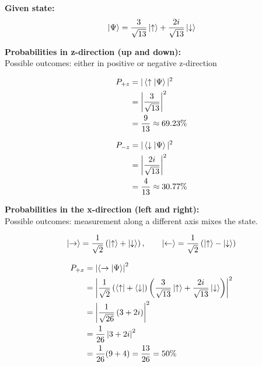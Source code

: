 \documentclass[12pt]{article}
\begin{document}
\textbf{Given state:}
\[
\ket{\Psi}=\frac{3}{\sqrt{13}}\ket{\uparrow} + \frac{2i}{\sqrt{13}}\ket{\downarrow}
\]

\textbf{Probabilities in z-direction (up and down):} \\
Possible outcomes: either in positive or negative z-direction

\begin{equation}
    \begin{split}
        P_{+z} &= |\braket{ \uparrow | \Psi}|^{2} \\
        &= \left|\frac{3}{\sqrt{13}}\right|^2 \\
        &= \frac{9}{13} \approx 69.23\% \\
    \end{split}
\end{equation}

\begin{equation}
    \begin{split}
        P_{-z} &= |\braket{ \downarrow | \Psi}|^{2} \\
        &= \left|\frac{2i}{\sqrt{13}}\right|^2 \\
        &= \frac{4}{13} \approx 30.77\% \\
    \end{split}
\end{equation}


\raggedright
\textbf{Probabilities in the x-direction (left and right):} \\
Possible outcomes: measurement along a different axis mixes the state.

\[
\ket{\rightarrow}=\frac{1}{\sqrt{2}}\left(\ket{\uparrow}+\ket{\downarrow}\right),
\qquad
\ket{\leftarrow}=\frac{1}{\sqrt{2}}\left(\ket{\uparrow}-\ket{\downarrow}\right)
\]

\begin{equation}
    \begin{split}
        P_{+x} &= \left|\braket{ \rightarrow | \Psi}\right|^{2} \\
        &= \left|\frac{1}{\sqrt{2}}\left(\bra{\uparrow}+\bra{\downarrow}\right)
        \left(\frac{3}{\sqrt{13}}\ket{\uparrow}+\frac{2i}{\sqrt{13}}\ket{\downarrow}\right)\right|^2 \\
        &= \left|\frac{1}{\sqrt{26}}\left(3 + 2i\right)\right|^2 \\
        &= \frac{1}{26}\left|3+2i\right|^2 \\
        &= \frac{1}{26}(9+4) = \frac{13}{26} = 50\% \\
    \end{split}
\end{equation}
\end{document}
